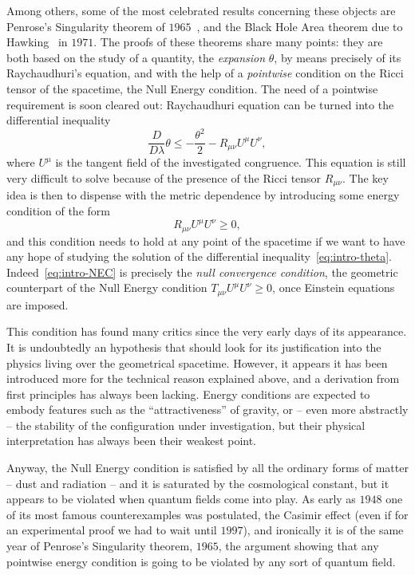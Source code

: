 Among others, some of the most celebrated results concerning these objects are Penrose's Singularity theorem of \(1965\)~\cite[]{penrose1965gravitational}, and the Black Hole Area theorem due to Hawking~\cite[]{hawking1972black} in \(1971\). The proofs of these theorems share many points: they are both based on the study of a quantity, the \emph{expansion} \(\theta\), by means precisely of its Raychaudhuri's equation, and with the help of a \emph{pointwise} condition on the Ricci tensor of the spacetime, the Null Energy condition. The need of a pointwise requirement is soon cleared out: Raychaudhuri equation can be turned into the differential inequality
\begin{equation}
    \label{eq:intro-theta}
    \frac{D}{D\lambda}\theta \le -\frac{\theta^2}{2} - R_{\mu\nu}U^{\mu}U^{\nu},
\end{equation}
where \(U^{\mu}\) is the tangent field of the investigated congruence.
This equation is still very difficult to solve because of the presence of the Ricci tensor \(R_{\mu\nu}\). The key idea is then to dispense with the metric dependence by introducing some energy condition of the form 
\begin{equation}
    \label{eq:intro-NEC}
    R_{\mu\nu}U^{\mu}U^{\nu}\ge 0,
\end{equation}
and this condition needs to hold at any point of the spacetime if we want to have any hope of studying the solution of the differential inequality~\eqref{eq:intro-theta}. Indeed~\eqref{eq:intro-NEC} is precisely the \emph{null convergence condition}, the geometric counterpart of the Null Energy condition \(T_{\mu\nu}U^{\mu}U^{\nu}\ge 0\), once Einstein equations are imposed.

This condition has found many critics since the very early days of its appearance. It is undoubtedly an hypothesis that should look for its justification into the physics living over the geometrical spacetime. However, it appears it has been introduced more for the technical reason explained above, and a derivation from first principles has always been lacking. Energy conditions are expected to embody features such as the ``attractiveness'' of gravity, or -- even more abstractly -- the stability of the configuration under investigation, but their physical interpretation has always been their weakest point.

Anyway, the Null Energy condition is satisfied by all the ordinary forms of matter -- dust and radiation -- and it is saturated by the cosmological constant, but it appears to be violated when quantum fields come into play.
As early as \(1948\) one of its most famous counterexamples was postulated, the Casimir effect (even if for an experimental proof we had to wait until \(1997\)), and ironically it is of the same year of Penrose's Singularity theorem, \(1965\), the argument showing that any pointwise energy condition is going to be violated by any sort of quantum field.

